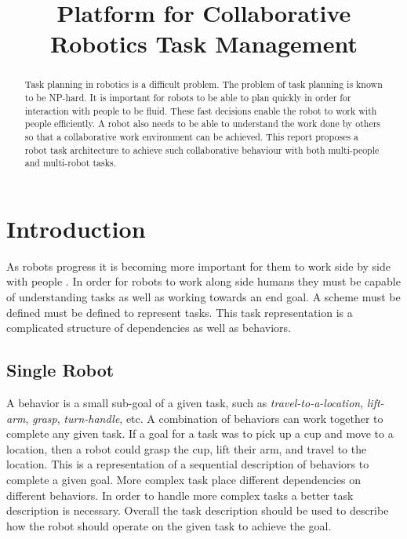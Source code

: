 \documentclass[conference]{IEEEtran}
\begin{document}
\title{Platform for Collaborative Robotics Task Management}

\author{
}

\maketitle

\IEEEpeerreviewmaketitle
\begin{abstract}
Task planning in robotics is a difficult problem. The problem of task planning is known to be NP-hard. It is important for robots to be able to plan quickly in order for interaction with people to be fluid. These fast decisions enable the robot to work with people efficiently. A robot also needs to be able to understand the work done by others so that a collaborative work environment can be achieved. This report proposes a robot task architecture to achieve such collaborative behaviour with both multi-people and multi-robot tasks.
\end{abstract}

\section{Introduction}
As robots progress it is becoming more important for them to work side by side with people \cite{Breazeal2004}. In order for robots to work along side humans they must be capable of understanding tasks as well as working towards an end goal. A scheme must be defined must be defined to represent tasks. This task representation is a complicated structure of dependencies as well as behaviors.

\subsection{Single Robot}
A behavior is a small sub-goal of a given task, such as \emph{travel-to-a-location}, \emph{lift-arm}, \emph{grasp}, \emph{turn-handle}, etc. A combination of behaviors can work together to complete any given task. If a goal for a task was to pick up a cup and move to a location, then a robot could grasp the cup, lift their arm, and travel to the location. This is a representation of a sequential description of behaviors to complete a given goal. More complex task place different dependencies on different behaviors. In order to handle more complex tasks a better task description is necessary. Overall the task description should be used to describe how the robot should operate on the given task to achieve the goal.
\end{document}
